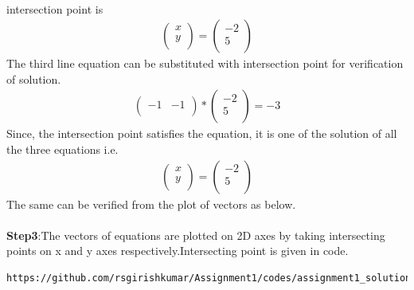 \documentclass[journal,12pt,twocolumn]{IEEEtran}
\begin{document}
\\intersection point is 
\begin{align*}
\begin{pmatrix}x\\y\\\end{pmatrix}=\begin{pmatrix}-2\\5\\\end{pmatrix}
\end{align*}
The third line equation can be substituted with intersection point for verification of solution.
\begin{align*}
\begin{pmatrix}-1 & -1\\\end{pmatrix}*\begin{pmatrix}-2\\5\\\end{pmatrix}=-3
\end{align*}
Since, the intersection point satisfies the equation, it is one of the solution of all the three equations i.e.
\begin{align*}
\begin{pmatrix}x\\y\\\end{pmatrix}=\begin{pmatrix}-2\\5\\\end{pmatrix}
\end{align*}
The same can be verified from the plot of vectors as below.\\
\\
\textbf{Step3}:The vectors of equations are plotted on 2D axes by taking intersecting points on x and y axes respectively.Intersecting point is given in code.\\
\begin{lstlisting}
https://github.com/rsgirishkumar/Assignment1/codes/assignment1_solution.py
\end{lstlisting}
\end{document}
